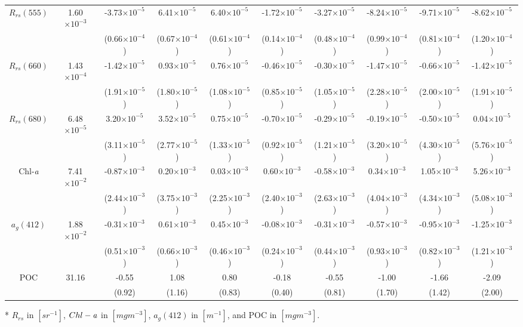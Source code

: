 \documentclass[preview]{standalone}
\begin{document}
\begin{threeparttable}
\begin{tabular}{cccccccccc}
$R_{rs}(555)$ & 1.60$\times10^{-3}$	& -3.73$\times10^{-5}$  &   6.41$\times10^{-5}$  &   6.40$\times10^{-5}$  &  -1.72$\times10^{-5}$  &  -3.27$\times10^{-5}$  &  -8.24$\times10^{-5}$  &  -9.71$\times10^{-5}$  &  -8.62$\times10^{-5}$ \\
	&& (0.66$\times10^{-4}$) & (0.67$\times10^{-4}$) & (0.61$\times10^{-4}$) & (0.14$\times10^{-4}$) & (0.48$\times10^{-4}$) & (0.99$\times10^{-4}$) & (0.81$\times10^{-4}$) & (1.20$\times10^{-4}$) \\ \hline
$R_{rs}(660)$ & 1.43$\times10^{-4}$	& -1.42$\times10^{-5}$ &    0.93$\times10^{-5}$ &    0.76$\times10^{-5}$ &   -0.46$\times10^{-5}$ &   -0.30$\times10^{-5}$ &   -1.47$\times10^{-5}$ &   -0.66$\times10^{-5}$ &   -1.42$\times10^{-5}$ \\
	&& (1.91$\times10^{-5}$) & (1.80$\times10^{-5}$) & (1.08$\times10^{-5}$) & (0.85$\times10^{-5}$) & (1.05$\times10^{-5}$) & (2.28$\times10^{-5}$) & (2.00$\times10^{-5}$) & (1.91$\times10^{-5}$) \\ \hline
$R_{rs}(680)$ & 6.48$\times10^{-5}$	&  3.20$\times10^{-5}$ &    3.52$\times10^{-5}$ &    0.75$\times10^{-5}$ &   -0.70$\times10^{-5}$ &   -0.29$\times10^{-5}$ &   -0.19$\times10^{-5}$ &   -0.50$\times10^{-5}$ &    0.04$\times10^{-5}$ \\
	&& (3.11$\times10^{-5}$) & (2.77$\times10^{-5}$) & (1.33$\times10^{-5}$) & (0.92$\times10^{-5}$) & (1.21$\times10^{-5}$) & (3.20$\times10^{-5}$) & (4.30$\times10^{-5}$) & (5.76$\times10^{-5}$) \\ \hline
Chl-\it{a}    & 7.41$\times10^{-2}$ & -0.87$\times10^{-3}$ &    0.20$\times10^{-3}$ &    0.03$\times10^{-3}$ &    0.60$\times10^{-3}$ &   -0.58$\times10^{-3}$ &    0.34$\times10^{-3}$ &    1.05$\times10^{-3}$ &    5.26$\times10^{-3}$ \\ 
	&& (2.44$\times10^{-3}$) & (3.75$\times10^{-3}$) & (2.25$\times10^{-3}$) & (2.40$\times10^{-3}$) & (2.63$\times10^{-3}$) & (4.04$\times10^{-3}$) & (4.34$\times10^{-3}$) & (5.08$\times10^{-3}$) \\ \hline
$a_{g}(412)$  & 1.88$\times10^{-2}$ & -0.31$\times10^{-3}$ &    0.61$\times10^{-3}$ &    0.45$\times10^{-3}$ &   -0.08$\times10^{-3}$ &   -0.31$\times10^{-3}$ &   -0.57$\times10^{-3}$ &   -0.95$\times10^{-3}$ &   -1.25$\times10^{-3}$ \\ 
	&& (0.51$\times10^{-3}$) & (0.66$\times10^{-3}$) & (0.46$\times10^{-3}$) & (0.24$\times10^{-3}$) & (0.44$\times10^{-3}$) & (0.93$\times10^{-3}$) & (0.82$\times10^{-3}$) & (1.21$\times10^{-3}$) \\ \hline
POC		      & 31.16 & -0.55 &    1.08 &    0.80 &   -0.18 &   -0.55 &   -1.00 &   -1.66 &   -2.09 \\ 
	&& (0.92) & (1.16) & (0.83) & (0.40) & (0.81) & (1.70) & (1.42) & (2.00) \\ \hline

\end{tabular}
\begin{tablenotes}\tiny
\item [*] $R_{rs}$ in $[sr^{-1}]$, $Chl-\it{a}$ in $[mg m^{-3}]$, $a_{g}(412)$ in $[m^{-1}]$, and POC in $[mg m^{-3}]$.
\end{tablenotes}
\end{threeparttable}
\end{document}

